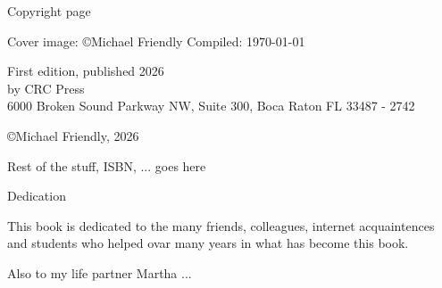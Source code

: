 
\thispagestyle{empty}

\Large{Copyright page}

Cover image: \copyright Michael Friendly
Compiled: \today

First edition, published 2026 \\
by CRC Press \\
6000 Broken Sound Parkway NW, Suite 300, Boca Raton FL 33487 - 2742

\copyright Michael Friendly, 2026

Rest of the stuff, ISBN, ... goes here

\cleardoublepage

\begin{center}
\Large{Dedication}

This book is dedicated to the many friends, colleagues, internet acquaintences and students who helped ovar many years in what has become this book.

Also to my life partner Martha ...
\end{center}

\setlength{\abovedisplayskip}{-5pt}
\setlength{\abovedisplayshortskip}{-5pt}



\hfuzz=5.002pt